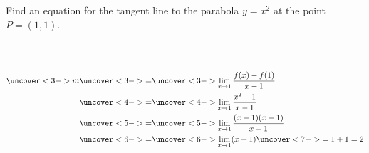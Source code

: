 \begin{frame}
\begin{example}[Example 1, p. 136]
Find an equation for the tangent line to the parabola $y = x^2$ at the point $P = (1,1)$.

\begin{columns}[c]
\ %
%
\abovedisplayskip=0pt
\belowdisplayskip=0pt
\abovedisplayshortskip=0pt
\belowdisplayshortskip=0pt
\begin{align*}
\uncover<3->{m} & \uncover<3->{ = }  \uncover<3->{\lim_{x\rightarrow 1} \frac{f(x)-f(1)}{x-1}}\\
& \uncover<4->{ = }  %
\uncover<4->{\lim_{x\rightarrow 1}\frac{x^2 - 1}{x-1}}\\
& \uncover<5->{ = }  %
\uncover<5->{\lim_{x\rightarrow 1}\frac{(x - 1)(x+1)}{x-1}}\\
& \uncover<6->{ = }  %
\uncover<6->{\lim_{x\rightarrow 1}(x+1)}\uncover<7->{ = 1 + 1 = 2}
\end{align*}
\end{columns}
\end{example}
\end{frame}
